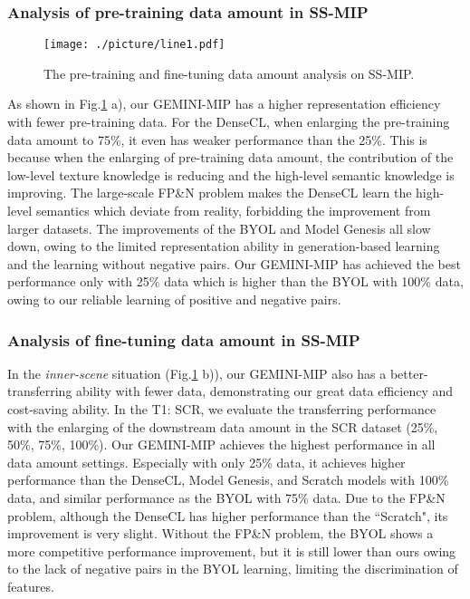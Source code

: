 \subsubsection{Analysis of pre-training data amount in SS-MIP}
\begin{figure}
  \centering
  \texttt{[image: ./picture/line1.pdf]}
  \caption{The pre-training and fine-tuning data amount analysis on SS-MIP.}\label{Fig:line}%
\end{figure}
As shown in Fig.\ref{Fig:line} a), our GEMINI-MIP has a higher representation efficiency with fewer pre-training data. For the DenseCL, when enlarging the pre-training data amount to 75\%, it even has weaker performance than the 25\%. This is because when the enlarging of pre-training data amount, the contribution of the low-level texture knowledge is reducing and the high-level semantic knowledge is improving. The large-scale FP\&N problem makes the DenseCL learn the high-level semantics which deviate from reality, forbidding the improvement from larger datasets. The improvements of the BYOL and Model Genesis all slow down, owing to the limited representation ability in generation-based learning and the learning without negative pairs. Our GEMINI-MIP has achieved the best performance only with 25\% data which is higher than the BYOL with 100\% data, owing to our reliable learning of positive and negative pairs.

\subsubsection{Analysis of fine-tuning data amount in SS-MIP}
In the \emph{inner-scene} situation (Fig.\ref{Fig:line} b)), our GEMINI-MIP also has a better-transferring ability with fewer data, demonstrating our great data efficiency and cost-saving ability. In the T1: SCR, we evaluate the transferring performance with the enlarging of the downstream data amount in the SCR dataset (25\%, 50\%, 75\%, 100\%). Our GEMINI-MIP achieves the highest performance in all data amount settings. Especially with only 25\% data, it achieves higher performance than the DenseCL, Model Genesis, and Scratch models with 100\% data, and similar performance as the BYOL with 75\% data. Due to the FP\&N problem, although the DenseCL has higher performance than the ``Scratch", its improvement is very slight. Without the FP\&N problem, the BYOL shows a more competitive performance improvement, but it is still lower than ours owing to the lack of negative pairs in the BYOL learning, limiting the discrimination of features.

